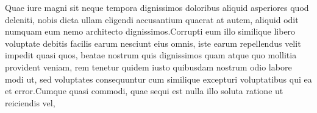 \documentclass[letterpaper]{article} %
\begin{document}
\fontsize{9.0pt}{10.0pt}\selectfont  Quae iure magni sit neque tempora dignissimos doloribus aliquid asperiores quod deleniti, nobis dicta ullam eligendi accusantium quaerat at autem, aliquid odit numquam eum nemo architecto dignissimos.Corrupti eum illo similique libero voluptate debitis facilis earum nesciunt eius omnis, iste earum repellendus velit impedit quasi quos, beatae nostrum quis dignissimos quam atque quo mollitia provident veniam, rem tenetur quidem iusto quibusdam nostrum odio labore modi ut, sed voluptates consequuntur cum similique excepturi voluptatibus qui ea et error.Cumque quasi commodi, quae sequi est nulla illo soluta ratione ut reiciendis vel,


\end{document}

